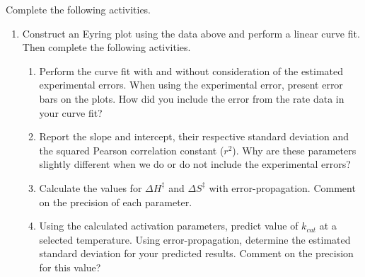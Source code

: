 \documentclass{tufte-handout}
\begin{document}
Complete the following activities.

\begin{enumerate}
\item Construct an Eyring plot using the data above and perform a linear curve fit. Then complete the following activities.

\begin{enumerate}
\item Perform the curve fit with and without consideration of the estimated experimental errors. When using the experimental error, present error bars on the plots. How did you include the error from the rate data in your curve fit?

\item Report the slope and intercept, their respective standard deviation and the squared Pearson correlation constant ($r^2$). Why are these parameters slightly different when we do or do not include the exp\-er\-i\-ment\-al errors?

\item Calculate the values for $\Delta H^\ddagger$ and $\Delta S^\ddagger$ with error-propagation.
Com\-ment on the precision of each parameter. 

\item Using the calculated activation parameters, predict value of $k_{cat}$ at a selected temperature. Using error-propagation, determine the estimated standard deviation for your predicted results. Comment on the precision for this value?


\end{enumerate}
\end{enumerate}
\end{document}
